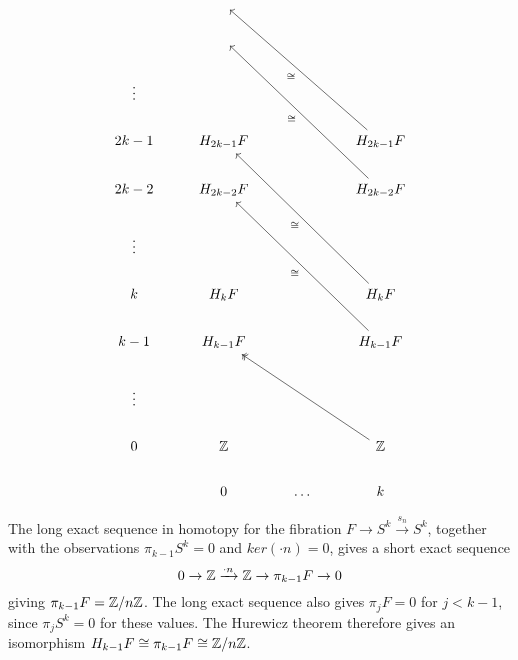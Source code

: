 \begin{example}
\[\begin{tikzcd}
       & {}        &       &                                 \\
       & {}        &       &                                 \\
\vdots &           &       &                                 \\
2k-1   & H_{2k-1}F &       & H_{2k-1}F \arrow[lluuu, "\iso"] \\
2k-2   & H_{2k-2}F &       & H_{2k-2}F \arrow[lluuu, "\iso"] \\
\vdots &           &       &                                 \\
k      & H_kF      &       & H_kF \arrow[lluuu, "\iso"]      \\
k-1    & H_{k-1}F  &       & H_{k-1}F \arrow[lluuu, "\iso"]  \\
\vdots &           &       &                                 \\
0      & \Z        &       & \Z \arrow[lluu, two heads]      \\
       & 0         & \dots & k                              
\end{tikzcd}\]

The long exact sequence in homotopy for the fibration $F\rightarrow S^k\xrightarrow{s_n} S^k$, together with the observations $\pi_{k-1}S^k=0$ and $ker(\cdot n)=0$, gives a short exact sequence
$$0\rightarrow \mathbb{Z} \xrightarrow[]{\cdot n}\mathbb{Z}\rightarrow \pi_{k-1}F\rightarrow 0$$
giving $\pi_{k-1}F=\mathbb{Z}/n\mathbb{Z}$. The long exact sequence also gives $\pi_jF=0$ for $j<k-1$, since $\pi_j S^k=0$ for these values. The Hurewicz theorem therefore gives an isomorphism $H_{k-1}F\cong \pi_{k-1}F\cong \mathbb{Z}/n\mathbb{Z}$.


\end{example}

